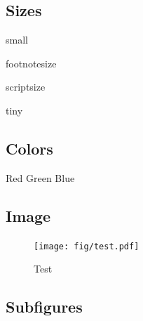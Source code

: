 \documentclass{article}
\begin{document}
\subsection{Sizes}\label{subsec:sizes}

\begin{small}
small
\end{small}

\begin{footnotesize}
footnotesize
\end{footnotesize}

\begin{scriptsize}
scriptsize
\end{scriptsize}

\begin{tiny}
tiny
\end{tiny}


\subsection{Colors}\label{subsec:colors}

{\color{red} Red}
{\color{green} Green}
{\color{blue} Blue}


\subsection{Image}\label{subsec:image}

\begin{figure}
    \centering
    \ifpdf
    \texttt{[image: fig/test.pdf]}
    \else
    \fi
    \caption{\label{fig:test}Test}
\end{figure}


\subsection{Subfigures}\label{subsec:subfig}

\begin{figure}
    \centering
    ~
    ~
    ~\\
    ~
    ~
\end{figure}
\end{document}
